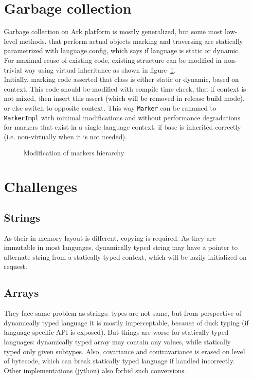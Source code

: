 \documentclass[times, %
			   specification,annotation, %
			   titlepage-extra-ru,specification-extra-ru,annotation-extra-ru, %
			   languages={russian,english} %
			  ]{itmo-student-thesis}
\begin{document}
\section{Garbage collection}
Garbage collection on Ark platform is mostly generalized, but some most low-level methods, that perform actual objects marking and traversing are statically parametrized with language config, which says if language is static or dynamic. For maximal reuse of existing code, existing structure can be modified in non-trivial way using virtual inheritance as shown in figure~\ref{fig:gc-markers}.\\
Initially, marking code asserted that class is either static or dynamic, based on context. This code should be modified with compile time check, that if context is not mixed, then insert this assert (which will be removed in release build mode), or else switch to opposite context. This way \texttt{Marker} can be ranamed to \texttt{MarkerImpl} with minimal modifications and without performance degradations for markers that exist in a single language context, if base is inherited correctly (i.e. non-virtually when it is not needed).\\
\begin{figure}[H]
\caption{Modification of markers hierarchy}\label{fig:gc-markers}
\centering
\end{figure}

\section{Challenges}
\subsection{Strings}
As their in memory layout is different, copying is required. As they are immutable in most languages, dynamically typed string may have a pointer to alternate string from a statically typed context, which will be lazily initialized on request.
\subsection{Arrays}
They face same problem as strings: types are not same, but from perspective of dynamically typed language it is mostly imperceptable, because of duck typing (if language-specific API is exposed). But things are worse for statically typed languages: dynamically typed array may contain any values, while statically typed only given subtypes. Also, covariance and contravariance is erased on level of bytecode, which can break statically typed language if handled incorrectly. Other implementations (jython) also forbid such conversions.
\end{document}
